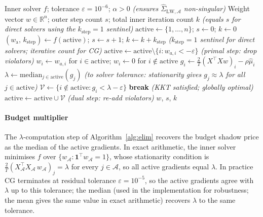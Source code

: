 \begin{algorithm}[ht]
\caption{Active-set outer loop (wraps any inner solver $f$)}\label{alg:elim}
\begin{algorithmic}[1]
\Require Inner solver $f$;\; tolerance $\varepsilon = 10^{-6}$;\; $\alpha > 0$
  \hfill\textit{(ensures $\hat\Sigma_{\mathrm{LW},\mathcal{A}}$ non-singular)}
\Ensure Weight vector $w \in \mathbb{R}^n$;\; outer step count $s$;\; total inner iteration count $k$ \textit{(equals $s$ for direct solvers using the $k_{\mathrm{step}}=1$ sentinel)}
\State $\mathrm{active} \leftarrow \{1,\ldots,n\}$;\; $s \leftarrow 0$;\; $k \leftarrow 0$
\Loop
  \State $(w_{\mathrm{a}},\, k_{\mathrm{step}}) \leftarrow f(\mathrm{active})$;\; $s \leftarrow s + 1$;\; $k \leftarrow k + k_{\mathrm{step}}$
    \hfill\textit{($k_{\mathrm{step}} = 1$ sentinel for direct solvers; iterative count for CG)}
    \State $\mathrm{active} \leftarrow \mathrm{active} \setminus \{i : w_{a,i} < -\varepsilon\}$
      \hfill\textit{(primal step: drop violators)}
  \Else
    \State $w_i \leftarrow w_{a,i}$ for $i \in \mathrm{active}$;\; $w_i \leftarrow 0$ for $i \notin \mathrm{active}$
    \State $g_i \leftarrow \tfrac{2}{T}(X^\top Xw)_i - \rho\hat\mu_i$
    \State $\lambda \leftarrow \mathrm{median}_{j \in \mathrm{active}}(g_j)$
      \hfill\textit{(to solver tolerance: stationarity gives $g_j \approx \lambda$ for all $j \in \mathrm{active}$)}
    \State $\mathcal{V} \leftarrow \{i \notin \mathrm{active} : g_i < \lambda - \varepsilon\}$
      \State \textbf{break} \hfill\textit{(KKT satisfied; globally optimal)}
    \EndIf
    \State $\mathrm{active} \leftarrow \mathrm{active} \cup \mathcal{V}$
      \hfill\textit{(dual step: re-add violators)}
  \EndIf
\EndLoop
\State \Return $w$, $s$, $k$
\end{algorithmic}
\end{algorithm}

\paragraph{Budget multiplier}
The $\lambda$-computation step of Algorithm~\ref{alg:elim} recovers the budget shadow price as the median
of the active gradients. In exact arithmetic, the inner solver minimises $f$ over
$\{w_\mathcal{A} : \mathbf{1}^\top w_\mathcal{A} = 1\}$, whose stationarity
condition is $\tfrac{2}{T}(X_\mathcal{A}^\top X_\mathcal{A}\,w_\mathcal{A})_j = \lambda$
for every $j \in \mathcal{A}$, so all active gradients equal $\lambda$.
In practice CG terminates at residual tolerance $\varepsilon = 10^{-5}$, so
the active gradients agree with $\lambda$ up to this tolerance; the median (used in the implementation for robustness; the mean gives the
same value in exact arithmetic) recovers $\lambda$ to the same tolerance.

